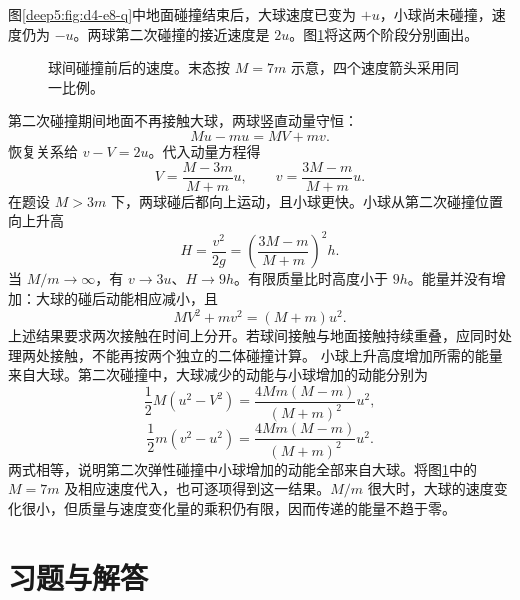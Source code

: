 \begin{solution}
图\ref{deep5:fig:d4-e8-q}中地面碰撞结束后，大球速度已变为 $+u$，小球尚未碰撞，速度仍为 $-u$。两球第二次碰撞的接近速度是 $2u$。图\ref{deep5:fig:d4-e8-s}将这两个阶段分别画出。
\begin{figure}[H]\centering
{}
\caption{球间碰撞前后的速度。末态按 $M=7m$ 示意，四个速度箭头采用同一比例。}\label{deep5:fig:d4-e8-s}
\end{figure}
第二次碰撞期间地面不再接触大球，两球竖直动量守恒：
\begin{equation}
 Mu-mu=MV+mv.
\end{equation}
恢复关系给 $v-V=2u$。代入动量方程得
\begin{equation}
 V=\frac{M-3m}{M+m}u,\qquad
 v=\frac{3M-m}{M+m}u.
\end{equation}
在题设 $M>3m$ 下，两球碰后都向上运动，且小球更快。小球从第二次碰撞位置向上升高
\begin{equation}
 H=\frac{v^2}{2g}
 =\left(\frac{3M-m}{M+m}\right)^2h.
\end{equation}
当 $M/m\to\infty$，有 $v\to3u$、$H\to9h$。有限质量比时高度小于 $9h$。能量并没有增加：大球的碰后动能相应减小，且
\begin{equation}
 MV^2+mv^2=(M+m)u^2.
\end{equation}
上述结果要求两次接触在时间上分开。若球间接触与地面接触持续重叠，应同时处理两处接触，不能再按两个独立的二体碰撞计算。
小球上升高度增加所需的能量来自大球。第二次碰撞中，大球减少的动能与小球增加的动能分别为
\[
\frac12M(u^2-V^2)
=\frac{4Mm(M-m)}{(M+m)^2}u^2,
\]
\[
\frac12m(v^2-u^2)
=\frac{4Mm(M-m)}{(M+m)^2}u^2.
\]
两式相等，说明第二次弹性碰撞中小球增加的动能全部来自大球。将图\ref{deep5:fig:d4-e8-s}中的 $M=7m$ 及相应速度代入，也可逐项得到这一结果。$M/m$ 很大时，大球的速度变化很小，但质量与速度变化量的乘积仍有限，因而传递的能量不趋于零。

\end{solution}



\section{习题与解答}


